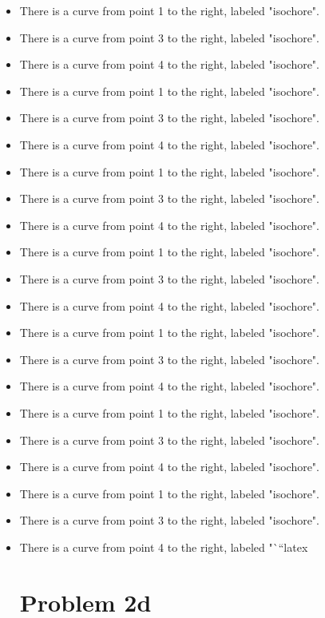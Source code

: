 \begin{itemize}
    \item There is a curve from point 1 to the right, labeled "isochore".
    \item There is a curve from point 3 to the right, labeled "isochore".
    \item There is a curve from point 4 to the right, labeled "isochore".
    \item There is a curve from point 1 to the right, labeled "isochore".
    \item There is a curve from point 3 to the right, labeled "isochore".
    \item There is a curve from point 4 to the right, labeled "isochore".
    \item There is a curve from point 1 to the right, labeled "isochore".
    \item There is a curve from point 3 to the right, labeled "isochore".
    \item There is a curve from point 4 to the right, labeled "isochore".
    \item There is a curve from point 1 to the right, labeled "isochore".
    \item There is a curve from point 3 to the right, labeled "isochore".
    \item There is a curve from point 4 to the right, labeled "isochore".
    \item There is a curve from point 1 to the right, labeled "isochore".
    \item There is a curve from point 3 to the right, labeled "isochore".
    \item There is a curve from point 4 to the right, labeled "isochore".
    \item There is a curve from point 1 to the right, labeled "isochore".
    \item There is a curve from point 3 to the right, labeled "isochore".
    \item There is a curve from point 4 to the right, labeled "isochore".
    \item There is a curve from point 1 to the right, labeled "isochore".
    \item There is a curve from point 3 to the right, labeled "isochore".
    \item There is a curve from point 4 to the right, labeled "```latex


\section*{Problem 2d}


\end{itemize}
